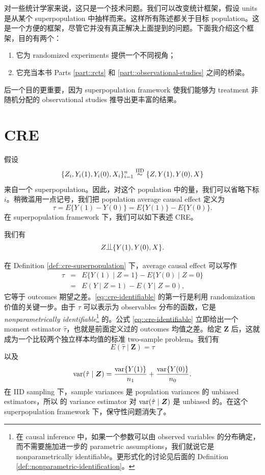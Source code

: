   
  
  
对一些统计学家来说，这只是一个技术问题。我们可以改变统计框架，假设 units 是从某个 superpopulation 中抽样而来。这样所有陈述都关于目标 population。这是一个方便的框架，尽管它并没有真正解决上面提到的问题。下面我介绍这个框架，目的有两个：
\begin{enumerate}
\item
它为 randomized experiments 提供一个不同视角；
\item
它充当本书 Parts \ref{part::rcts} 和  \ref{part::observational-studies} 之间的桥梁。
\end{enumerate}
后一个目的更重要，因为 superpopulation framework 使我们能够为 treatment 非随机分配的 observational studies 推导出更丰富的结果。 





\section{CRE}\label{sec::cre-superpop}

假设 
$$
\{  Z_i, Y_i(1), Y_i(0),  X_i  \}_{i=1}^n  \stackrel{\textup{IID}}{\sim} \{  Z, Y(1), Y(0), X \}
$$ 
来自一个 superpopulation。因此，对这个 population 中的量，我们可以省略下标 $i$。稍微滥用一点记号，我们把 population average causal effect 定义为
$$
\tau  = E\{  Y(1)  - Y(0)\}  = E\{  Y(1)  \} -  E\{ Y(0)\} .
$$
在 superpopulation framework 下，我们可以如下表述 CRE。

\begin{definition}
\label{def::cre-superpopulation}
我们有
$$
Z \ind \{  Y(1), Y(0), X \} .
$$
\end{definition}

在 Definition \ref{def::cre-superpopulation} 下，average causal effect 可以写作
\begin{eqnarray}
\tau &=& E\{  Y(1) \mid Z=1\}  - E\{  Y(0) \mid Z=0 \}   \nonumber  \\
&=& E( Y \mid Z=1)  - E(  Y \mid Z=0 ),
\label{eq::cre-identifiable}
\end{eqnarray}
它等于 outcomes 期望之差。\eqref{eq::cre-identifiable} 的第一行是利用 randomization 价值的关键一步。由于 $\tau  $ 可以表示为 observables 分布的函数，它是 {\it nonparametrically identifiable}\footnote{在 causal inference 中，如果一个参数可以由 observed variables 的分布确定，而不需要施加进一步的 parametric assumptions，我们就说它是 nonparametrically identifiable。更形式化的讨论见后面的 Definition \ref{def::nonparametric-identification}。} 的。公式 \eqref{eq::cre-identifiable} 立即给出一个 moment estimator $\hat{\tau}$，也就是前面定义过的 outcomes 均值之差。给定 $\boldsymbol{Z}$ 后，这就成为一个比较两个独立样本均值的标准 two-sample problem。我们有
$$
E(  \hat{\tau} \mid \boldsymbol{Z}) = \tau
$$
以及
$$
\textup{var} (  \hat{\tau} \mid \boldsymbol{Z}) =   \frac{ \textup{var}\{ Y(1) \}}{n_1} + \frac{ \textup{var}\{ Y(0) \}}{n_0}.
$$
在 IID sampling 下，sample variances 是 population variances 的 unbiased estimators，所以 \citet{Neyman:1923} 的 variance estimator 对 $\textup{var} (  \hat{\tau} \mid \boldsymbol{Z}) $ 是 unbiased 的。在这个 superpopulation framework 下，保守性问题消失了。


